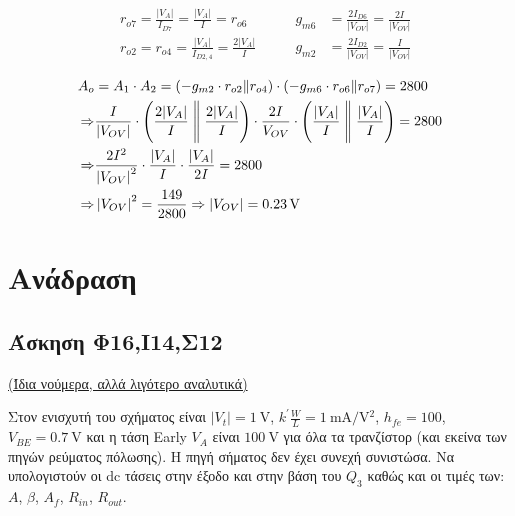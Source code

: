 \documentclass[11pt,a4paper,titlepage,fleqn]{article}
\begin{document}
\[
\left.
\begin{aligned}
	& r_{o7} = \frac{\left|V_A\right|}{I_{D7}} = \frac{\left|V_A\right|}{I} = r_{o6} \\ &
	r_{o2} = r_{o4} = \frac{\left|V_A\right|}{I_{D2,4}} = \frac{2\left|V_A\right|}{I}
\end{aligned}
\right.
\begin{aligned}
	\qquad g_{m6} &= \frac{2 I_{D6}}{\left|V_{OV}\right|}= \frac{2I}{\left|V_{OV}\right|}\\
	\qquad g_{m2} &= \frac{2 I_{D2}}{\left|V_{OV}\right|}= \frac{I}{\left|V_{OV}\right|}
\end{aligned}
\]

\[
\begin{aligned}
	A_o &= A_1 \cdot A_2 = \left(-g_{m2}\cdot r_{o2}\| r_{o4} \right) \cdot \left(-g_{m6}\cdot r_{o6}\| r_{o7} \right) = 2800 \\ \Rightarrow & \frac{I}{\left|V_{OV}\right|} \cdot \left(\frac{2|V_A|}{I} \Biggm\Vert \frac{2|V_A|}{I}\right) \cdot \frac{2I}{V_{OV}} \cdot \left(\frac{|V_A|}{I} \Biggm\Vert \frac{|V_A|}{I}\right) = 2800 \\ \Rightarrow & \frac{2I^2}{\left|V_{OV}\right|^2} \cdot \frac{|V_A|}{I} \cdot \frac{|V_A|}{2I} = 2800 \\ \Rightarrow & \left|V_{OV}\right|^2 = \frac{149}{2800} \Rightarrow \left|V_{OV}\right| = \SI{0,23}{\volt}
\end{aligned}
\]

\section{Ανάδραση}

\subsection{Άσκηση Φ16,Ι14,Σ12}
\label{sec:anadr.F16,I14,S12}

\hyperref[sec:Anadrasi.xatzo.paromoia]{(Ίδια νούμερα, αλλά λιγότερο αναλυτικά)}

Στον ενισχυτή του σχήματος είναι $\left|V_t\right| = \SI{1}{\volt}$, 
$k^{'} \frac{W}{L}= \SI[per-mode=symbol]{1}{\milli\ampere\per\volt^2}$, $h_{fe}=100$, $V_{BE}=\SI{0,7}{\volt}$ και η τάση Early $V_A$ είναι $\SI{100}{\volt}$ για όλα τα τρανζίστορ (και εκείνα των πηγών ρεύματος πόλωσης). H πηγή σήματος δεν έχει συνεχή συνιστώσα. Να υπολογιστούν οι dc τάσεις στην έξοδο και στην βάση του $Q_3$ καθώς και οι τιμές των: $A$, $\beta$, $A_f$, $R_{in}$, $R_{out}$.
\end{document}
